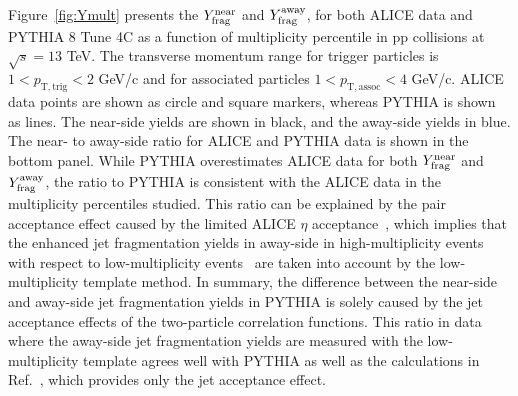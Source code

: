 Figure~\ref{fig:Ymult} presents the $Y^{\mathrm{near}}_{\rm{frag}}$ and $Y^{\mathrm{away}}_{\rm{frag}}$, for both ALICE data and PYTHIA 8 Tune 4C as a function of multiplicity percentile in pp collisions at $\sqrt{s}=13$ TeV. The transverse momentum range for trigger particles is $1<p_\mathrm{T,trig}<2$ GeV/c and for associated particles $1<p_\mathrm{T,assoc}<4$ GeV/c. ALICE data points are shown as circle and square markers, whereas PYTHIA is shown as lines. The near-side yields are shown in black, and the away-side yields in blue.
The near- to away-side ratio for ALICE and PYTHIA data is shown in the bottom panel. While PYTHIA overestimates ALICE data for both $Y^{\mathrm{near}}_{\rm{frag}}$ and $Y^{\mathrm{away}}_{\rm{frag}}$, the ratio to PYTHIA is consistent with the ALICE data in the multiplicity percentiles studied. This ratio can be explained by the pair acceptance effect caused by the limited ALICE $\eta$ acceptance~\cite{PHENIX:2006gto}, which implies that the enhanced jet fragmentation yields in away-side in high-multiplicity events with respect to low-multiplicity events~\cite{ALICE:2013tla,ALICE:2014mas} are taken into account by the low-multiplicity template method. In summary, the difference between the near-side and away-side jet fragmentation yields in PYTHIA is solely caused by the jet acceptance effects of the two-particle correlation functions. This ratio in data where the away-side jet fragmentation yields are measured with the low-multiplicity template agrees well with PYTHIA as well as the calculations in Ref.~\cite{PHENIX:2006gto}, which provides only the jet acceptance effect.



